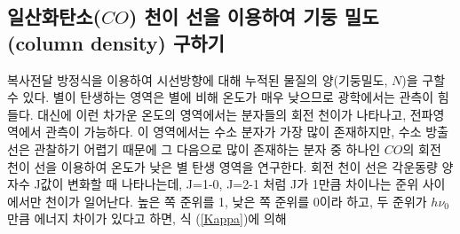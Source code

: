 \subsection{일산화탄소($CO$) 천이 선을 이용하여 기둥 밀도(column density) 구하기}
복사전달 방정식을 이용하여 시선방향에 대해 누적된 물질의 양(기둥밀도, $N$)을 구할 수 있다. 별이 탄생하는 영역은 별에 비해 온도가 매우 낮으므로 광학에서는 관측이 힘들다. 대신에 이런 차가운 온도의 영역에서는 분자들의 회전 천이가 나타나고, 전파영역에서 관측이 가능하다. 이 영역에서는 수소 분자가 가장 많이 존재하지만, 수소 방출선은 관찰하기 어렵기 때문에 그 다음으로 많이 존재하는 분자 중 하나인 $CO$의 회전 천이 선을 이용하여 온도가 낮은 별 탄생 영역을 연구한다. 회전 천이 선은 각운동량 양자수 J값이 변화할 때 나타나는데, J=1-0, J=2-1 처럼 J가 1만큼 차이나는 준위 사이에서만 천이가 일어난다. 높은 쪽 준위를 1, 낮은 쪽 준위를 0이라 하고, 두 준위가 $h\nu_0$ 만큼 에너지 차이가 있다고 하면,  식 (\ref{Kappa})에 의해


